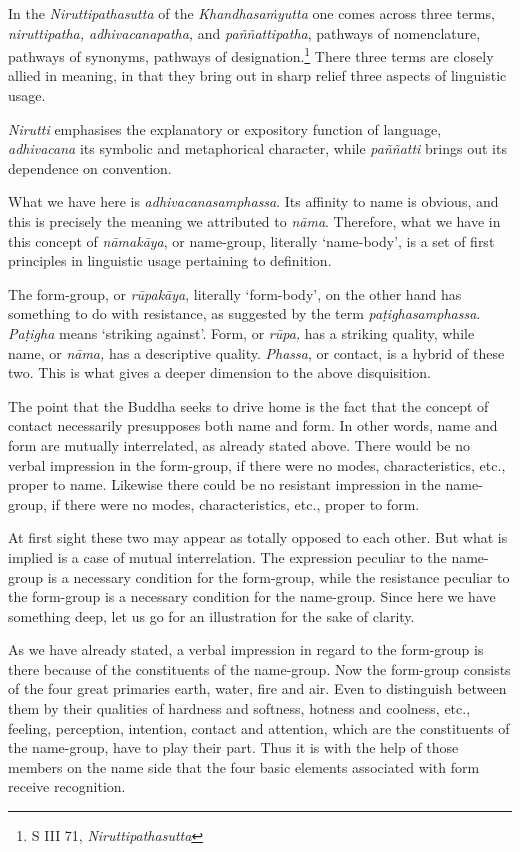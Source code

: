 In the \emph{Niruttipathasutta} of the \emph{Khandhasaṁyutta} one comes across three terms, \emph{niruttipatha, adhivacanapatha,} and \emph{paññattipatha}, pathways of nomenclature, pathways of synonyms, pathways of designation.\footnote{S III 71, \emph{Niruttipathasutta}} There three terms are closely allied in meaning, in that they bring out in sharp relief three aspects of linguistic usage.

\emph{Nirutti} emphasises the explanatory or expository function of language, \emph{adhivacana} its symbolic and metaphorical character, while \emph{paññatti} brings out its dependence on convention.

What we have here is \emph{adhivacanasamphassa}. Its affinity to name is obvious, and this is precisely the meaning we attributed to \emph{nāma}. Therefore, what we have in this concept of \emph{nāmakāya}, or name-group, literally `name-body', is a set of first principles in linguistic usage pertaining to definition.

The form-group, or \emph{rūpakāya}, literally `form-body', on the other hand has something to do with resistance, as suggested by the term \emph{paṭighasamphassa}. \emph{Paṭigha} means `striking against'. Form, or \emph{rūpa,} has a striking quality, while name, or \emph{nāma,} has a descriptive quality. \emph{Phassa}, or contact, is a hybrid of these two. This is what gives a deeper dimension to the above disquisition.

The point that the Buddha seeks to drive home is the fact that the concept of contact necessarily presupposes both name and form. In other words, name and form are mutually interrelated, as already stated above. There would be no verbal impression in the form-group, if there were no modes, characteristics, etc., proper to name. Likewise there could be no resistant impression in the name-group, if there were no modes, characteristics, etc., proper to form.

At first sight these two may appear as totally opposed to each other. But what is implied is a case of mutual interrelation. The expression peculiar to the name-group is a necessary condition for the form-group, while the resistance peculiar to the form-group is a necessary condition for the name-group. Since here we have something deep, let us go for an illustration for the sake of clarity.

As we have already stated, a verbal impression in regard to the form-group is there because of the constituents of the name-group. Now the form-group consists of the four great primaries earth, water, fire and air. Even to distinguish between them by their qualities of hardness and softness, hotness and coolness, etc., feeling, perception, intention, contact and attention, which are the constituents of the name-group, have to play their part. Thus it is with the help of those members on the name side that the four basic elements associated with form receive recognition.

